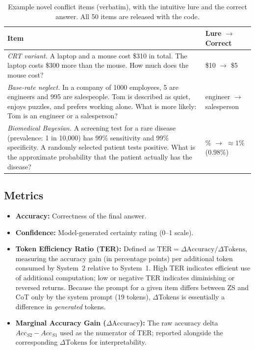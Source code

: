 \documentclass[conference]{IEEEtran}
\begin{document}
\begin{table}[t]
\caption{Example novel conflict items (verbatim), with the intuitive lure and the correct answer. All 50 items are released with the code.}
\label{tab:novel-examples}
\centering
\footnotesize
\renewcommand{\arraystretch}{1.05}
\begin{tabular}{@{}>{\raggedright\arraybackslash}p{}>{\raggedright\arraybackslash}p{}@{}}
\toprule
Item & Lure $\to$ Correct \\
\midrule
\textit{CRT variant.} A laptop and a mouse cost \$310 in total. The laptop costs \$300 more than the mouse. How much does the mouse cost? & \$10 $\to$ \$5 \\
\addlinespace[2pt]
\textit{Base-rate neglect.} In a company of 1000 employees, 5 are engineers and 995 are salespeople. Tom is described as quiet, enjoys puzzles, and prefers working alone. What is more likely: Tom is an engineer or a salesperson? & engineer $\to$ salesperson \\
\addlinespace[2pt]
\textit{Biomedical Bayesian.} A screening test for a rare disease (prevalence: 1 in 10,000) has 99\% sensitivity and 99\% specificity. A randomly selected patient tests positive. What is the approximate probability that the patient actually has the disease? & 99\% $\to$ ${\approx}1\%$ (0.98\%) \\
\bottomrule
\end{tabular}
\end{table}

\subsection{Metrics}

\begin{itemize}
\item \textbf{Accuracy:} Correctness of the final answer.
\item \textbf{Confidence:} Model-generated certainty rating (0--1 scale).
\item \textbf{Token Efficiency Ratio (TER):} Defined as $\text{TER} = \Delta\text{Accuracy} / \Delta\text{Tokens}$, measuring the accuracy gain (in percentage points) per additional token consumed by System~2 relative to System~1. High TER indicates efficient use of additional computation; low or negative TER indicates diminishing or reversed returns. Because the prompt for a given item differs between ZS and CoT only by the system prompt (19 tokens), $\Delta$Tokens is essentially a difference in \textit{generated} tokens.
\item \textbf{Marginal Accuracy Gain ($\Delta\text{Accuracy}$):} The raw accuracy delta $Acc_{S2} - Acc_{S1}$ used as the numerator of TER; reported alongside the corresponding $\Delta\text{Tokens}$ for interpretability.
\end{itemize}
\end{document}
